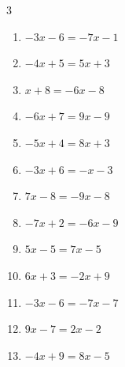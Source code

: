 \begin{multicols}{3}
\begin{enumerate}

\columnbreak %

  \item $-3x-6=-7x-1$


  \item $-4x+5=5x+3$


  \item $x+8=-6x-8$


  \item $-6x+7=9x-9$


  \item $-5x+4=8x+3$


  \item $-3x+6=-x-3$


  \item $7x-8=-9x-8$

        \phantom{$\displaystyle x=0$}

  \item $-7x+2=-6x-9$

        \phantom{$\displaystyle x=11$}

  \item $5x-5=7x-5$

        \phantom{$\displaystyle x=0$}

  \item $6x+3=-2x+9$


  \item $-3x-6=-7x-7$


  \item $9x-7=2x-2$


  \item $-4x+9=8x-5$



\end{enumerate}
\end{multicols}
